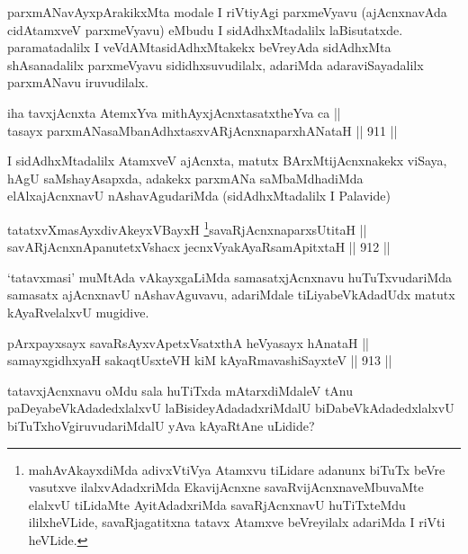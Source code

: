 \begin{artha}
parxmANavAyxpArakikxMta modale I riVtiyAgi parxmeVyavu (ajAcnxnavAda cidAtamxveV parxmeVyavu) eMbudu I sidAdhxMtadalilx laBisutatxde. paramatadalilx I veVdAMtasidAdhxMtakekx beVreyAda sidAdhxMta shAsanadalilx parxmeVyavu sididhxsuvudilalx, adariMda adaraviSayadalilx parxmANavu iruvudilalx.
\end{artha}


\begin{shl}
iha tavxjAcnxta AtemxYva mithAyxjAcnxtasatxtheYva ca || \\
tasayx parxmANasaMbanAdhxtasxvARjAcnxnaparxhANataH \hfill || 911 ||  
\end{shl}

\begin{artha}
I sidAdhxMtadalilx AtamxveV ajAcnxta, matutx BArxMtijAcnxnakekx viSaya, hAgU saMshayAsapxda, adakekx parxmANa saMbaMdhadiMda elAlx\break ajAcnxnavU nAshavAgudariMda (sidAdhxMtadalilx I Palavide)
\end{artha}


\begin{shl}
tatatxvXmasAyxdivAkeyxVBayxH \footnote{mahAvAkayxdiMda adivxVtiVya Atamxvu tiLidare adanunx biTuTx beVre vasutxve ilalxvAdadxriMda EkavijAcnxne savaRvijAcnxnaveMbuvaMte elalxvU tiLidaMte AyitAdadxriMda savaRjAcnxnavU huTiTxteMdu ililxheVLide, savaRjagatitxna tatavx Atamxve beVreyilalx adariMda I riVti heVLide.}savaRjAcnxnaparxsUtitaH || \\
savARjAcnxnApanutetxVshacx jecnxVyakAyaRsamApitxtaH \hfill || 912 ||  
\end{shl}

\begin{artha}
`tatavxmasi' muMtAda vAkayxgaLiMda samasatxjAcnxnavu huTuTxvudariMda samasatx ajAcnxnavU nAshavAguvavu, adariMdale tiLiyabeVkAdadUdx matutx kAyaRvelalxvU mugidive.
\end{artha}


\begin{shl}
pArxpayxsayx savaRsAyxvApetxVsatxthA heVyasayx hAnataH || \\
samayxgidhxyaH sakaqtUsxteVH kiM kAyaRmavashiSayxteV \hfill || 913 ||  
\end{shl}

\begin{artha}
tatavxjAcnxnavu oMdu sala huTiTxda mAtarxdiMdaleV tAnu paDeyabeVkAdadedxlalxvU laBisideyAdadadxriMdalU biDabeVkAdadedxlalxvU biTuTxhoVgiruvudariMdalU yAva kAyaRtAne uLidide?
\end{artha}

